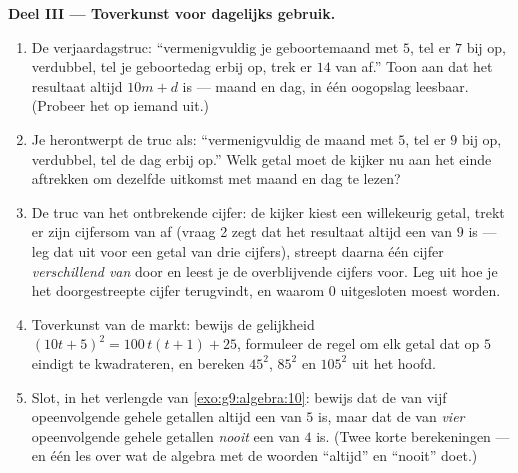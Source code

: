 \begin{problem}
\medskip
\noindent\textbf{Deel III --- Toverkunst voor dagelijks gebruik.}
\begin{enumerate}[resume]
  \item De verjaardagstruc: ``vermenigvuldig je geboortemaand met $5$, tel er $7$
        bij op, verdubbel, tel je geboortedag erbij op, trek er $14$ van af.'' Toon
        aan dat het resultaat altijd $10m + d$ is --- maand en dag, in één oogopslag
        leesbaar. (Probeer het op iemand uit.)
  \item Je herontwerpt de truc als: ``vermenigvuldig de maand met $5$, tel er $9$
        bij op, verdubbel, tel de dag erbij op.'' Welk getal moet de kijker nu aan
        het einde aftrekken om dezelfde uitkomst met maand en dag te lezen?
  \item De truc van het ontbrekende cijfer: de kijker kiest een willekeurig getal,
        trekt er zijn cijfersom van af (vraag 2 zegt dat het resultaat altijd een
         van $9$ is --- leg dat uit voor een getal van drie cijfers), streept
        daarna één cijfer \emph{verschillend van } door en leest je de
        overblijvende cijfers voor. Leg uit hoe je het doorgestreepte cijfer
        terugvindt, en waarom $0$ uitgesloten moest worden.
  \item Toverkunst van de markt: bewijs de gelijkheid
        $(10t + 5)^2 = 100\,t(t+1) + 25$, formuleer de regel om elk getal dat op
        $5$ eindigt te kwadrateren, en bereken $45^2$, $85^2$ en $105^2$ uit het
        hoofd.
  \item Slot, in het verlengde van \cref{exo:g9:algebra:10}: bewijs dat de  van
        vijf opeenvolgende gehele getallen altijd een  van $5$ is, maar dat
        de  van \emph{vier} opeenvolgende gehele getallen \emph{nooit} een
         van $4$ is. (Twee korte berekeningen --- en één les over wat de
        algebra met de woorden ``altijd'' en ``nooit'' doet.)
\end{enumerate}
\end{problem}
